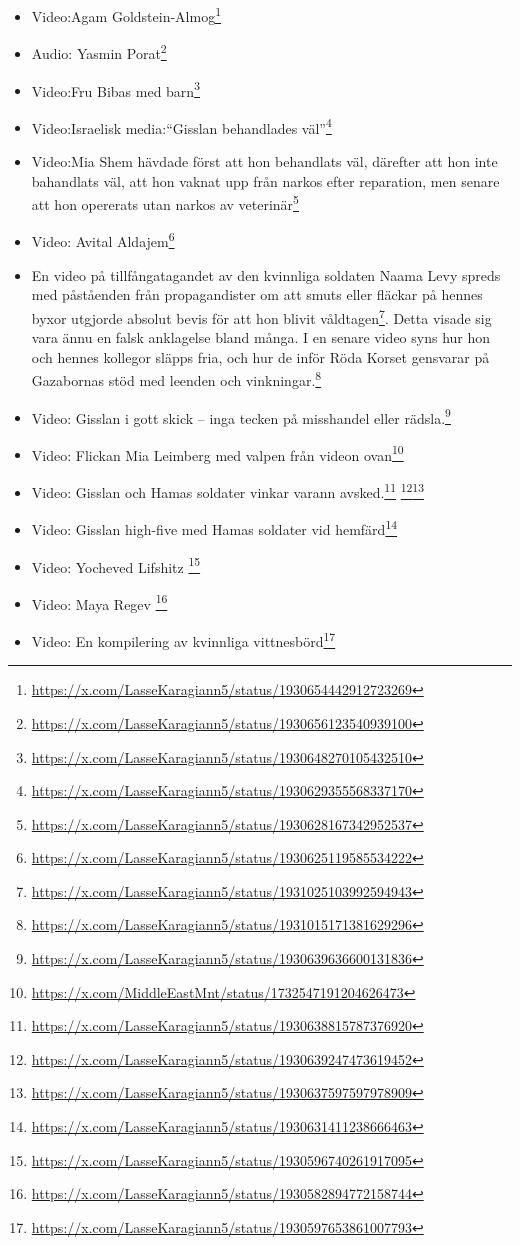 \documentclass[12pt]{article}
\begin{document}
\begin{itemize}
\item Video:Agam Goldstein-Almog\footnote{\url{https://x.com/LasseKaragiann5/status/1930654442912723269}}
\item Audio: Yasmin Porat\footnote{\url{https://x.com/LasseKaragiann5/status/1930656123540939100}}
\item Video:Fru Bibas med barn\footnote{\url{https://x.com/LasseKaragiann5/status/1930648270105432510}}
\item Video:Israelisk media:\enquote{Gisslan behandlades väl}\footnote{\url{https://x.com/LasseKaragiann5/status/1930629355568337170}}
\item Video:Mia Shem hävdade först att hon behandlats väl, därefter att hon inte bahandlats väl, att hon vaknat upp från narkos efter reparation, men senare att hon opererats utan narkos av veterinär\footnote{\url{https://x.com/LasseKaragiann5/status/1930628167342952537}}
\item Video: Avital Aldajem\footnote{\url{https://x.com/LasseKaragiann5/status/1930625119585534222}}
\item En video på tillfångatagandet av den kvinnliga soldaten Naama Levy spreds med påståenden från propagandister om att smuts eller fläckar på hennes byxor utgjorde absolut bevis för att hon blivit våldtagen\footnote{\url{https://x.com/LasseKaragiann5/status/1931025103992594943}}. Detta visade sig vara ännu en falsk anklagelse bland många. I en senare video syns hur hon och hennes kollegor släpps fria, och hur de inför Röda Korset gensvarar på Gazabornas stöd med leenden och vinkningar.\footnote{\url{https://x.com/LasseKaragiann5/status/1931015171381629296}}

\item Video: Gisslan i gott skick – inga tecken på misshandel eller rädsla.\footnote{\url{https://x.com/LasseKaragiann5/status/1930639636600131836}}
\item Video: Flickan Mia Leimberg med valpen från videon ovan\footnote{\url{https://x.com/MiddleEastMnt/status/1732547191204626473}}
\item Video: Gisslan och Hamas soldater vinkar varann avsked.\footnote{\url{https://x.com/LasseKaragiann5/status/1930638815787376920}} \footnote{\url{https://x.com/LasseKaragiann5/status/1930639247473619452}}\footnote{\url{https://x.com/LasseKaragiann5/status/1930637597597978909}}

\item Video: Gisslan high-five med Hamas soldater vid hemfärd\footnote{\url{https://x.com/LasseKaragiann5/status/1930631411238666463}}
\item Video: Yocheved Lifshitz \footnote{\url{https://x.com/LasseKaragiann5/status/1930596740261917095}}
\item Video: Maya Regev \footnote{\url{https://x.com/LasseKaragiann5/status/1930582894772158744}}
\item Video: En kompilering av kvinnliga vittnesbörd\footnote{\url{https://x.com/LasseKaragiann5/status/1930597653861007793}}
\end{itemize}
\end{document}
